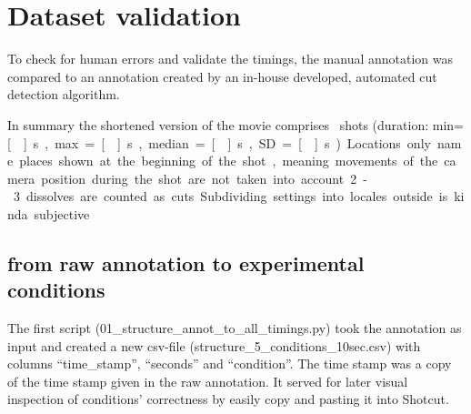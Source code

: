 \documentclass[10pt,a4paper,twocolumn]{article}
\begin{document}
\section*{Dataset validation}

To check for human errors and validate the timings, the manual annotation was
compared to an annotation created by an in-house developed, automated cut
detection algorithm.

In summary the shortened version of the movie comprises
\NShots\ shots (duration: min=\unit[\ShotLengthMin]{s},
max=\unit[\ShotLengthMax]{s}, median=\unit[\ShotLengthMedian]{s},
SD=\unit[\ShotLengthSD]{s}).



Locations only name places shown at the beginning of the shot, meaning 
movements of the camera position during the shot are not taken into account.
2-3 dissolves are counted as cuts
Subdividing settings into locales outside is kinda subjective 


\subsection*{from raw annotation to experimental conditions}


The first script (01\_structure\_annot\_to\_all\_timings.py) took
the annotation as input and created a new csv-file (structure\_5\_conditions\_10sec.csv)
with columns ``time\_stamp'', ``seconds'' and ``condition''.
The time stamp was a copy of the time stamp given in the raw annotation.
It served for later visual inspection of conditions' correctness by
easily copy and pasting it into Shotcut. 
\end{document}
